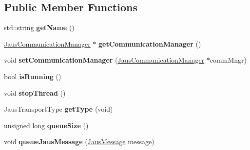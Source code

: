 \subsection*{\-Public \-Member \-Functions}
\begin{DoxyCompactItemize}
\item 
\hypertarget{class_jaus_transport_interface_ad6fff9fe6cfe7ea0ba18f108d9371ccf}{std\-::string {\bfseries get\-Name} ()}\label{class_jaus_transport_interface_ad6fff9fe6cfe7ea0ba18f108d9371ccf}

\item 
\hypertarget{class_jaus_transport_interface_a86fc8922b4a705d7c463a5ff533dab4f}{\hyperlink{class_jaus_communication_manager}{\-Jaus\-Communication\-Manager} $\ast$ {\bfseries get\-Communication\-Manager} ()}\label{class_jaus_transport_interface_a86fc8922b4a705d7c463a5ff533dab4f}

\item 
\hypertarget{class_jaus_transport_interface_aa691b69c77023769011ee63f51d9f43d}{void {\bfseries set\-Communication\-Manager} (\hyperlink{class_jaus_communication_manager}{\-Jaus\-Communication\-Manager} $\ast$comm\-Mngr)}\label{class_jaus_transport_interface_aa691b69c77023769011ee63f51d9f43d}

\item 
\hypertarget{class_jaus_transport_interface_a9d76b8657d6a61b937bfcca185f24ab0}{bool {\bfseries is\-Running} ()}\label{class_jaus_transport_interface_a9d76b8657d6a61b937bfcca185f24ab0}

\item 
\hypertarget{class_jaus_transport_interface_ae8347e93d3ab59a7c3a4773fc2a5a6ed}{void {\bfseries stop\-Thread} ()}\label{class_jaus_transport_interface_ae8347e93d3ab59a7c3a4773fc2a5a6ed}

\item 
\hypertarget{class_jaus_transport_interface_aeb7af744688b76bb47d0f62d9b4fe9af}{\-Jaus\-Transport\-Type {\bfseries get\-Type} (void)}\label{class_jaus_transport_interface_aeb7af744688b76bb47d0f62d9b4fe9af}

\item 
\hypertarget{class_jaus_transport_interface_ad7727872ed6c5a2026fd79316ec75eb5}{unsigned long {\bfseries queue\-Size} ()}\label{class_jaus_transport_interface_ad7727872ed6c5a2026fd79316ec75eb5}

\item 
\hypertarget{class_jaus_transport_interface_a0b8a92438e1caeeaf4d5fd0f4c9d9c23}{void {\bfseries queue\-Jaus\-Message} (\hyperlink{struct_jaus_message_struct}{\-Jaus\-Message} message)}\label{class_jaus_transport_interface_a0b8a92438e1caeeaf4d5fd0f4c9d9c23}


\end{DoxyCompactItemize}
